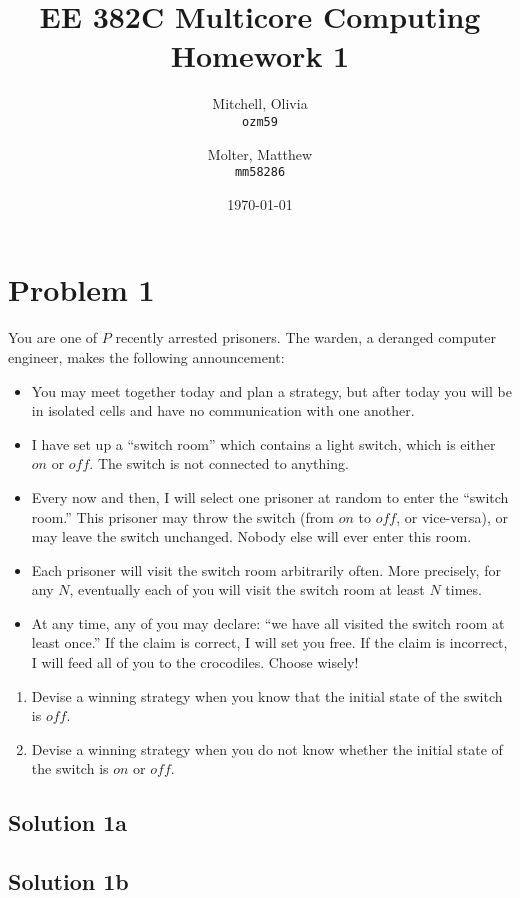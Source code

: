 \documentclass{article}
\title{EE 382C Multicore Computing Homework 1}
\author{
    Mitchell, Olivia\\
    \texttt{ozm59}
    \and
    Molter, Matthew\\
    \texttt{mm58286}}
\date{\today}
\begin{document}
\maketitle

\section{Problem 1}
 You are one of $P$ recently arrested prisoners. The warden, a deranged computer engineer, makes the following announcement:
\begin{itemize}
  \item You may meet together today and plan a strategy, but after today you will be in isolated cells and have no communication with one another.
  \item I have set up a “switch room” which contains a light switch, which is either $on$ or $off$. The switch is not connected to anything.
  \item Every now and then, I will select one prisoner at random to enter the “switch room.” This prisoner may throw the switch (from $on$ to $off$, or vice-versa), or may leave the switch unchanged. Nobody else will ever enter this room.
  \item Each prisoner will visit the switch room arbitrarily often. More precisely, for any $N$, eventually each of you will visit the switch room at least $N$ times.
  \item At any time, any of you may declare: “we have all visited the switch room at least once.” If the claim is correct, I will set you free. If the claim is incorrect, I will feed all of you to the crocodiles. Choose wisely!
\end{itemize}

\begin{enumerate}[label=\alph*)]
  \item Devise a winning strategy when you know that the initial state of the switch is $off$.
  \item Devise a winning strategy when you do not know whether the initial state of the switch is $on$ or $off$.
\end{enumerate}

\subsection{Solution 1a}

\subsection{Solution 1b}
\end{document}
